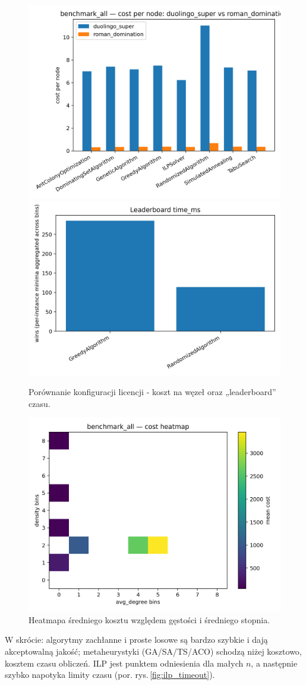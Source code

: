 \begin{figure}[h]
  \centering
  \includegraphics[width=0.48\linewidth]{assets/figures/ba_compare_cost_duo_vs_roman.png}
  \includegraphics[width=0.48\linewidth]{assets/figures/ba_leaderboard_time.png}
  \caption{Porównanie konfiguracji licencji - koszt na węzeł oraz „leaderboard” czasu.}
  \label{fig:compare_duo_roman}
\end{figure}

\begin{figure}[h]
  \centering
  \includegraphics[width=0.6\linewidth]{assets/figures/ba_heatmap_cost.png}
  \caption{Heatmapa średniego kosztu względem gęstości i średniego stopnia.}
  \label{fig:heatmap_cost}
\end{figure}

W skrócie: algorytmy zachłanne i proste losowe są bardzo szybkie i dają akceptowalną jakość; metaheurystyki (GA/SA/TS/ACO) schodzą niżej kosztowo, kosztem czasu obliczeń. ILP jest punktem odniesienia dla małych $n$, a następnie szybko napotyka limity czasu (por. rys.\,\ref{fig:ilp_timeout}).

